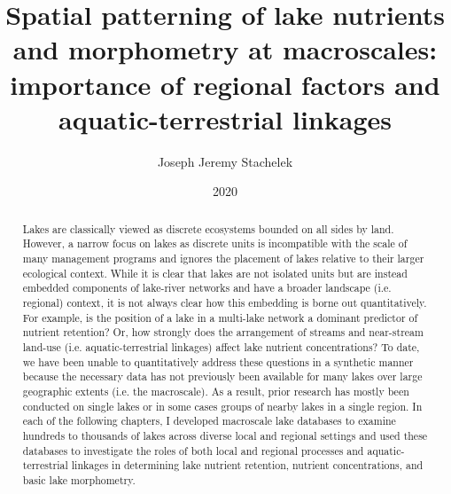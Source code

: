 \documentclass[]{msu-thesis}
\title{Spatial patterning of lake nutrients and morphometry at macroscales: importance of regional factors and aquatic-terrestrial linkages}
\author{Joseph Jeremy Stachelek}
\date{2020}
\theoremstyle{definition}
\theoremstyle{definition}
\theoremstyle{definition}
\theoremstyle{remark}
\begin{document}

\maketitlepage
\begin{abstract}
Lakes are classically viewed as discrete ecosystems bounded on all sides by land. However, a narrow focus on lakes as discrete units is incompatible with the scale of many management programs and ignores the placement of lakes relative to their larger ecological context. While it is clear that lakes are not isolated units but are instead embedded components of lake-river networks and have a broader landscape (i.e. regional) context, it is not always clear how this embedding is borne out quantitatively. For example, is the position of a lake in a multi-lake network a dominant predictor of nutrient retention? Or, how strongly does the arrangement of streams and near-stream land-use (i.e. aquatic-terrestrial linkages) affect lake nutrient concentrations?
To date, we have been unable to quantitatively address these questions in a synthetic manner because the necessary data has not previously been available for many lakes over large geographic extents (i.e. the macroscale). As a result, prior research has mostly been conducted on single lakes or in some cases groups of nearby lakes in a single region. In each of the following chapters, I developed macroscale lake databases to examine hundreds to thousands of lakes across diverse local and regional settings and used these databases to investigate the roles of both local and regional processes and aquatic-terrestrial linkages in determining lake nutrient retention, nutrient concentrations, and basic lake morphometry.


\end{abstract}
\end{document}
